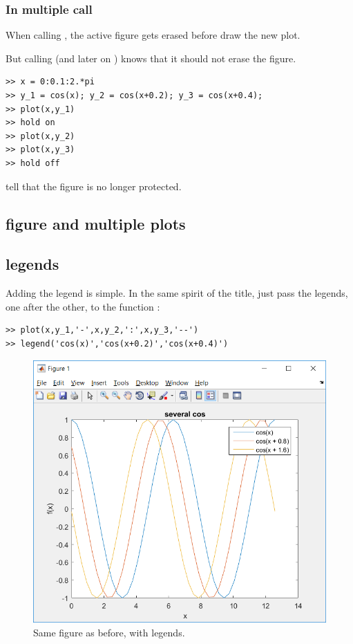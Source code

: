 		\subsubsection{In multiple call}
			When calling , the active figure gets erased before \matlab draw the new plot.
			
			But calling  (and later on ) \matlab knows that it should not erase the figure.
\begin{lstlisting}
>> x = 0:0.1:2.*pi
>> y_1 = cos(x); y_2 = cos(x+0.2); y_3 = cos(x+0.4);
>> plot(x,y_1)
>> hold on
>> plot(x,y_2)
>> plot(x,y_3)
>> hold off
\end{lstlisting}
			 tell \matlab that the figure is no longer protected.

	\subsection{figure and multiple plots}


	\subsection{legends}
		Adding the legend is simple.
		In the same spirit of the title, just pass the legends, one after the other, to the function :
\begin{lstlisting}
>> plot(x,y_1,'-',x,y_2,':',x,y_3,'--')
>> legend('cos(x)','cos(x+0.2)','cos(x+0.4)')
\end{lstlisting}

		\begin{figure}
			\center
			\includegraphics[height=0.43\linewidth]{./fig/multi_plot_legend.PNG} 
			\caption{
				Same figure as before, with legends.
			}
			\label{fig-legend}
		\end{figure}	






